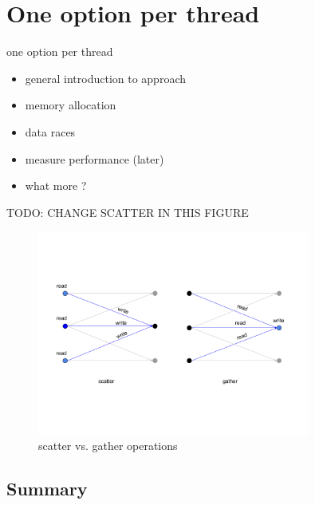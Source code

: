 \chapter{One option per thread}
\label{chapter:oneoptionperthread}
one option per thread
\begin{itemize}
\item general introduction to approach
\item memory allocation
\item data races
\item measure performance (later)
\item what more ?
\end{itemize}


TODO: CHANGE SCATTER IN THIS FIGURE
\begin{figure}[H]
	\centering
	\includegraphics[width=0.8\textwidth]{img/scattervsgather.png}
	\caption{scatter vs. gather operations}
	\label{fig:scattervsgather}
\end{figure}

\section*{Summary}
